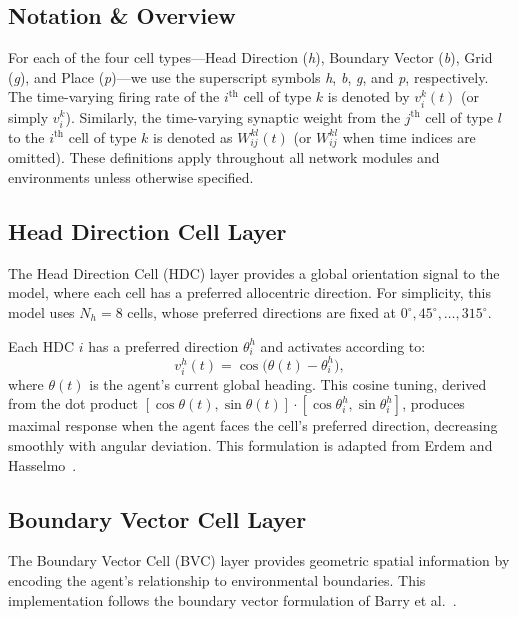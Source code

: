 \documentclass[conference]{IEEEtran}
\begin{document}
\subsection{Notation \& Overview}
For each of the four cell types---Head Direction (\textit{h}), Boundary Vector (\textit{b}), Grid (\textit{g}), and Place (\textit{p})---we use the superscript symbols \textit{h}, \textit{b}, \textit{g}, and \textit{p}, respectively. The time-varying firing rate of the $i^{\text{th}}$ cell of type $k$ is denoted by $v_i^k(t)$ (or simply $v_i^k$). Similarly, the time-varying synaptic weight from the $j^{\text{th}}$ cell of type $l$ to the $i^{\text{th}}$ cell of type $k$ is denoted as $W_{ij}^{kl}(t)$ (or $W_{ij}^{kl}$ when time indices are omitted). These definitions apply throughout all network modules and environments unless otherwise specified.

\subsection{Head Direction Cell Layer}
\label{sec:hd}

The Head Direction Cell (HDC) layer provides a global orientation signal to the model, where each cell has a preferred allocentric direction. For simplicity, this model uses $N_h = 8$ cells, whose preferred directions are fixed at $0^\circ, 45^\circ, \ldots, 315^\circ$. 

Each HDC $i$ has a preferred direction $\theta_i^h$ and activates according to:
\begin{equation}
v_i^h(t) = \cos\!\big(\theta(t) - \theta_i^h\big),
\label{eq:hd}
\end{equation}
where $\theta(t)$ is the agent's current global heading. This cosine tuning, derived from the dot product $[\cos\theta(t), \sin\theta(t)] \cdot [\cos\theta_i^h, \sin\theta_i^h]$, produces maximal response when the agent faces the cell's preferred direction, decreasing smoothly with angular deviation. This formulation is adapted from Erdem and Hasselmo~\cite{erdemHasselmo2012}.

\subsection{Boundary Vector Cell Layer}
\label{sec:bvc}

The Boundary Vector Cell (BVC) layer provides geometric spatial information by encoding the agent's relationship to environmental boundaries. This implementation follows the boundary vector formulation of Barry et al.~\cite{barry2006boundary}.
\end{document}
